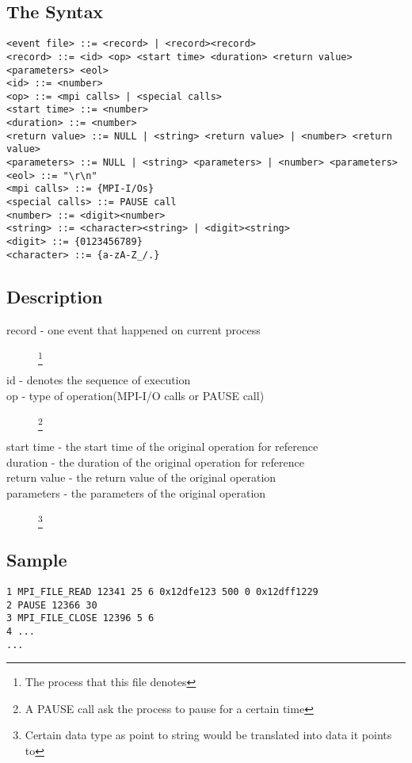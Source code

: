 \documentclass[9pt]{article}
\begin{document}
\subsection{The Syntax}
\label{sec:TheSyntax}
\begin{verbatim}
<event file> ::= <record> | <record><record>
<record> ::= <id> <op> <start time> <duration> <return value> <parameters> <eol>
<id> ::= <number>
<op> ::= <mpi calls> | <special calls>
<start time> ::= <number>
<duration> ::= <number>
<return value> ::= NULL | <string> <return value> | <number> <return value>
<parameters> ::= NULL | <string> <parameters> | <number> <parameters>
<eol> ::= "\r\n"
<mpi calls> ::= {MPI-I/Os}
<special calls> ::= PAUSE call
<number> ::= <digit><number>
<string> ::= <character><string> | <digit><string>
<digit> ::= {0123456789}
<character> ::= {a-zA-Z_/.}
\end{verbatim}

\subsection{Description}
\label{sec:Description}
\begin{description}
	\item[record - one event that happened on current process]\footnote{The process that this file denotes}
	\item[id - denotes the sequence of execution]
	\item[op - type of operation(MPI-I/O calls or PAUSE call)]\footnote{A PAUSE call ask the process to pause for a certain time}
	\item[start time - the start time of the original operation for reference]
	\item[duration - the duration of the original operation for reference]
        \item[return value - the return value of the original operation]
	\item[parameters - the parameters of the original operation]\footnote{Certain data type as point to string would be translated into data it points to}
\end{description}

\subsection{Sample}
\label{sec:SampleMPI}
\begin{verbatim}
1 MPI_FILE_READ 12341 25 6 0x12dfe123 500 0 0x12dff1229
2 PAUSE 12366 30
3 MPI_FILE_CLOSE 12396 5 6
4 ...
...
\end{verbatim}
\end{document}
